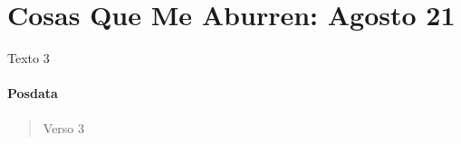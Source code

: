 \section{Cosas Que Me Aburren: Agosto 21}
\label{k3}
Texto 3
\paragraph{Posdata}
\begin{verse}
Verso 3
\end{verse}
